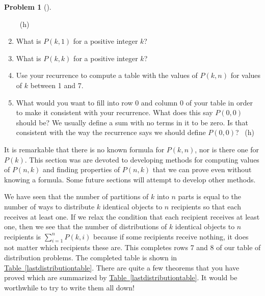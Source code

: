 \documentclass[10pt,]{book}
\theoremstyle{plain}
\theoremstyle{definition}
\newtheorem{activity}[project]{Problem}
\theoremstyle{definition}
\numberwithin{equation}{chapter}
\begin{document}
\begin{activity}[]
\begin{enumerate}[font=\bfseries,label=(\alph*),ref=\alph*]
~{\tiny (h)}\item\label{task-127} \marginsymbol[-2.5em]{} \hypertarget{p-964}{}%
What is \(P(k,1)\) for a positive integer \(k\)?%
\item\label{task-128} \marginsymbol[-2.5em]{} \hypertarget{p-966}{}%
What is \(P(k,k)\) for a positive integer \(k\)?%
\item\label{task-129} \marginsymbol[-2.5em]{} \hypertarget{p-968}{}%
Use your recurrence to compute a table with the values of \(P(k,n)\) for values of \(k\) between 1 and 7.%
\item\label{task-130} \marginsymbol[-2.5em]{} \hypertarget{p-969}{}%
What would you want to fill into row 0 and column 0 of your table in order to make it consistent with your recurrence.  What does this say \(P(0,0)\) should be?  We usually define a sum with no terms in it to be zero. Is that consistent with the way the recurrence says we should define \(P(0,0)\)?%
~{\tiny (h)}\end{enumerate}
\end{activity}
\hypertarget{p-972}{}%
It is remarkable that there is no known formula for \(P(k,n)\), nor is there one for \(P(k)\). This section was are devoted to developing methods for computing values of \(P(n,k)\) and finding properties of \(P(n,k)\) that we can prove even without knowing a formula. Some future sections will attempt to develop other methods.%
\par
\hypertarget{p-973}{}%
We have seen that the number of partitions of \(k\) into \(n\) parts is equal to the number of ways to distribute \(k\) identical objects to \(n\) recipients so that each receives at least one. If we relax the condition that each recipient receives at least one, then we see that the number of distributions of \(k\) identical objects to \(n\) recipients is \(\sum_{i=1}^n P(k,i)\) because if some recipients receive nothing, it does not matter which recipients these are. This completes rows 7 and 8 of our table of distribution problems. The completed table is shown in \hyperref[lastdistributiontable]{Table~\ref{lastdistributiontable}}. There are quite a few theorems that you have proved which are summarized by \hyperref[lastdistributiontable]{Table~\ref{lastdistributiontable}}.  It would be worthwhile to try to write them all down!%
\end{document}

